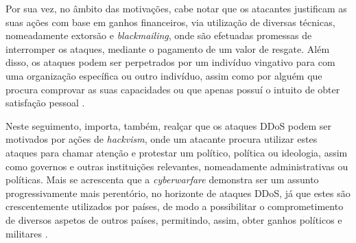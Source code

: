 Por sua vez, no âmbito das motivações, cabe notar que os atacantes justificam as suas ações com base em ganhos financeiros, via utilização de diversas técnicas, nomeadamente extorsão e \textit{blackmailing}, onde são efetuadas promessas de interromper os ataques, mediante o pagamento de um valor de resgate. Além disso, os ataques podem ser perpetrados por um indivíduo vingativo para com uma organização específica ou outro indivíduo, assim como por alguém que procura comprovar as suas capacidades ou que apenas possuí o intuito de obter satisfação pessoal \cite{cybergc_defending_agaisnt_ddos,perimeter81_ddos_motivations}.


Neste seguimento, importa, também, realçar que os ataques DDoS podem ser motivados por ações de \textit{hackvism}, onde um atacante procura utilizar estes ataques para chamar atenção e protestar um político, política ou ideologia, assim como governos e outras instituições relevantes, nomeadamente administrativas ou políticas. Mais se acrescenta que a \textit{cyberwarfare} demonstra ser um assunto progressivamente mais perentório, no horizonte de ataques DDoS, já que estes são crescentemente utilizados por países, de modo a possibilitar o comprometimento de diversos aspetos de outros países, permitindo, assim, obter ganhos políticos e militares \cite{cybergc_defending_agaisnt_ddos,perimeter81_ddos_motivations}.